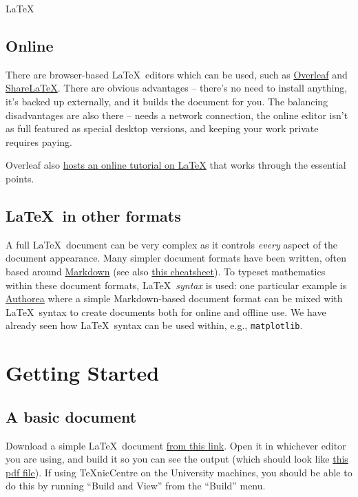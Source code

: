 \begin{chapter}{\LaTeX}
\subsection{Online}

There are browser-based \LaTeX\ editors which can be used, such as \href{https://www.overleaf.com/}{Overleaf} and \href{https://www.sharelatex.com/}{ShareLaTeX}. There are obvious advantages -- there's no need to install anything, it's backed up externally, and it builds the document for you. The balancing disadvantages are also there -- needs a network connection, the online editor isn't as full featured as special desktop versions, and keeping your work private requires paying.

Overleaf also \href{https://www.overleaf.com/latex/learn/free-online-introduction-to-latex-part-1}{hosts an online tutorial on \LaTeX} that works through the essential points.

\subsection{\LaTeX\ in other formats}

A full \LaTeX\ document can be very complex as it controls \emph{every} aspect of the document appearance. Many simpler document formats have been written, often based around \href{http://daringfireball.net/projects/markdown/}{Markdown} (see also \href{https://github.com/adam-p/markdown-here/wiki/Markdown-Cheatsheet}{this cheatsheet}). To typeset mathematics within these document formats, \LaTeX\ \emph{syntax} is used: one particular example is \href{https://www.authorea.com}{Authorea} where a simple Markdown-based document format can be mixed with \LaTeX\ syntax to create documents both for online and offline use. We have already seen how \LaTeX\ syntax can be used within, e.g., \texttt{matplotlib}.

\section{Getting Started}

\subsection{A basic document}

Download a simple \LaTeX\ document \href{https://raw.githubusercontent.com/IanHawke/maths-with-python/master/latex/BasicLatex.tex}{from this link}. Open it in whichever editor you are using, and build it so you can see the output (which should look like \href{https://github.com/IanHawke/maths-with-python/raw/master/latex/BasicLatex.pdf}{this pdf file}). If using TeXnicCentre on the University machines, you should be able to do this by running ``Build and View'' from the ``Build'' menu.


\end{chapter}
